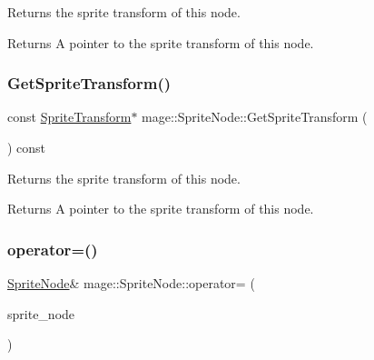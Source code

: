 Returns the sprite transform of this node.

\begin{DoxyReturn}{Returns}
A pointer to the sprite transform of this node. 
\end{DoxyReturn}
\hypertarget{classmage_1_1_sprite_node_a021d8d7d51a05330bfa6d034482988a0}{}\label{classmage_1_1_sprite_node_a021d8d7d51a05330bfa6d034482988a0} 
\subsubsection{\texorpdfstring{Get\+Sprite\+Transform()}{GetSpriteTransform()}\hspace{0.1cm}{\footnotesize\ttfamily [2/2]}}
{\footnotesize\ttfamily const \hyperlink{classmage_1_1_sprite_transform}{Sprite\+Transform}$\ast$ mage\+::\+Sprite\+Node\+::\+Get\+Sprite\+Transform (\begin{DoxyParamCaption}{ }\end{DoxyParamCaption}) const\hspace{0.3cm}{\ttfamily [noexcept]}}

Returns the sprite transform of this node.

\begin{DoxyReturn}{Returns}
A pointer to the sprite transform of this node. 
\end{DoxyReturn}
\hypertarget{classmage_1_1_sprite_node_a009228c9f53671a4275534ceb7733bd0}{}\label{classmage_1_1_sprite_node_a009228c9f53671a4275534ceb7733bd0} 
\subsubsection{\texorpdfstring{operator=()}{operator=()}\hspace{0.1cm}{\footnotesize\ttfamily [1/2]}}
{\footnotesize\ttfamily \hyperlink{classmage_1_1_sprite_node}{Sprite\+Node}\& mage\+::\+Sprite\+Node\+::operator= (\begin{DoxyParamCaption}\item[{const \hyperlink{classmage_1_1_sprite_node}{Sprite\+Node} \&}]{sprite\+\_\+node }\end{DoxyParamCaption})\hspace{0.3cm}{\ttfamily [delete]}}

